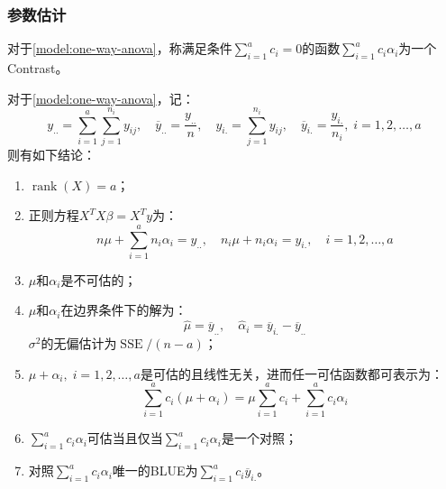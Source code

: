 \subsubsection{参数估计}
\begin{definition}
	对于\cref{model:one-way-anova}，称满足条件$\sum\limits_{i=1}^{a}c_i=0$的函数$\sum\limits_{i=1}^{a}c_i\alpha_i$为一个\gls{Contrast}。
\end{definition}
\begin{theorem}\label{theo:one-way-anova-estimate}
	对于\cref{model:one-way-anova}，记：
	\begin{equation*}
		y_{..}=\sum_{i=1}^a\sum_{j=1}^{n_i}y_{ij},\quad\overline{y}_{..}=\frac{y_{..}}{n},\quad y_{i.}=\sum_{j=1}^{n_i}y_{ij},\quad \overline{y}_{i.}=\frac{y_{i.}}{n_i},\;i=1,2,\dots,a
	\end{equation*}
	则有如下结论：
	\begin{enumerate}
		\item $\operatorname{rank}(X)=a$；
		\item 正则方程$X^TX\beta=X^Ty$为：
		\begin{equation*}
			n\mu+\sum_{i=1}^{a}n_i\alpha_i=y_{..},\quad n_i\mu+n_i\alpha_i=y_{i.},\quad i=1,2,\dots,a
		\end{equation*}
		\item $\mu$和$\alpha_i$是不可估的；
		\item $\mu$和$\alpha_i$在边界条件下的解为：
		\begin{equation*}
			\hat{\mu}=\overline{y}_{..},\quad\hat{\alpha}_i=\overline{y}_{i.}-\overline{y}_{..}
		\end{equation*}
		$\sigma^2$的无偏估计为$\operatorname{SSE}/(n-a)$；
		\item $\mu+\alpha_i,\;i=1,2,\dots,a$是可估的且线性无关，进而任一可估函数都可表示为：
		\begin{equation*}
			\sum_{i=1}^{a}c_i(\mu+\alpha_i)=\mu\sum_{i=1}^{a}c_i+\sum_{i=1}^{a}c_i\alpha_i
		\end{equation*}
		\item $\sum\limits_{i=1}^{a}c_i\alpha_i$可估当且仅当$\sum\limits_{i=1}^{a}c_i\alpha_i$是一个对照；
		\item 对照$\sum\limits_{i=1}^{a}c_i\alpha_i$唯一的BLUE为$\sum\limits_{i=1}^{a}c_i\overline{y}_{i.}$。
	\end{enumerate}
\end{theorem}
